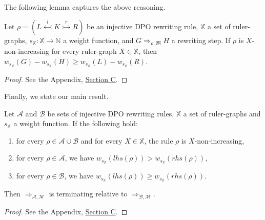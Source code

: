The following lemma captures the above reasoning.
\begin{lemma}
    \label{lem:w_g_geq_w_h_leq}
    Let $\rho \mathop{=} (L \overset{l}{\leftarrowtail} K \overset{r}{\rightarrowtail} R)$ be an injective DPO rewriting rule,
    \( \mathbb{X} \) a set of ruler-graphs,
    \( s_{\mathbb{X}} \mathop{\colon} \mathbb{X} \mathop{\to} \mathbb{N} \) a weight function,
    and \( G \mathop{\Rightarrow}_{\rho,\mathfrak{M}} H \) a rewriting step. 
    If $\rho$ is \( X \)-non-increasing for every ruler-graph \( X \mathop{\in} \mathbb{X} \), then $
        w_{s_\mathbb{X}}(G) - w_{s_\mathbb{X}}(H) 
        \mathop{\geq} 
        w_{s_\mathbb{X}}(L) - w_{s_\mathbb{X}}(R)
    $.
\end{lemma}
\begin{proof}
    See the Appendix, \hyperref[proof:lem:w_g_geq_w_h_leq]{Section C}.
\end{proof}
Finally, we state our main result.
\begin{theorem}[Termination] 
    \label{thm:termination_grs}
    Let \(\mathcal{A}\) and \(\mathcal{B}\) be sets of injective DPO rewriting rules, $\mathbb{X}$ a set of ruler-graphs and $s_\mathbb{X}$ a weight function. If the following hold:
    \begin{enumerate}
        \item  for every $\rho \mathop{\in} \mathcal{A} \mathop{\cup} \mathcal{B}$ and for every $X \mathop{\in} \mathbb{X}$, the rule $\rho$ is $X$-non-increasing,
        \item for every \(\rho \mathop{\in} \mathcal{A}\), we have \( w_{s_\mathbb{X}}(lhs(\rho)) \mathop{>} w_{s_\mathbb{X}}(rhs(\rho)) \),
        \item for every \(\rho \mathop{\in} \mathcal{B}\), we have \( w_{s_\mathbb{X}}(lhs(\rho)) \mathop{\geq} w_{s_\mathbb{X}}(rhs(\rho)) \).
    \end{enumerate}
    Then \(\mathop{\Rightarrow}_{\mathcal{A},\mathcal{M}}\) is terminating relative to \(\mathop{\Rightarrow}_{\mathcal{B},\mathcal{M}}\).
\end{theorem}
\begin{proof}
    See the Appendix, \hyperref[proof:thm:termination_grs]{Section C}.
\end{proof}